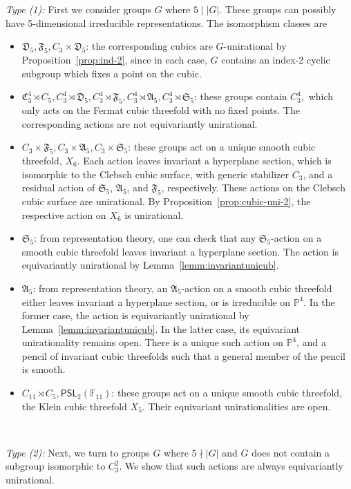 \documentclass[12pt,reqno]{amsart}
\theoremstyle{plain}
\theoremstyle{remark}
\theoremstyle{definition}
\numberwithin{equation}{section}
\def\fA{{\mathfrak A}}
\def\fC{{\mathfrak C}}
\def\fD{{\mathfrak D}}
\def\fF{{\mathfrak F}}
\def\fS{{\mathfrak S}}
\def\fS{{\mathfrak S}}
\def\bP{{\mathbb P}}
\def\bF{{\mathbb F}}
\def\PSL{\mathsf{PSL}}
\begin{document}
{\em{Type (1):}} First we consider groups $G$ where $5\mid|G|$. These groups can possibly have 5-dimensional irreducible representations. The isomorphism classes are 
\begin{itemize}
    \item $\fD_5,\fF_5,C_3\times\fD_5$: the corresponding cubics are $G$-unirational by Proposition~\ref{prop:ind-2}, since in each case, $G$ contains an index-2 cyclic subgroup which fixes a point on the cubic.
    \item $\fC_3^4\rtimes C_5, C_3^4\rtimes\fD_5, C_3^4\rtimes\fF_5, C_3^4\rtimes\fA_5, C_3^4\rtimes\fS_5$: these groups contain $C_3^4,$ which only acts on the Fermat cubic threefold with no fixed points. The corresponding actions are not equivariantly unirational. 
    \item $ C_3\times \fF_5, C_3\times \fA_5, C_3\times \fS_5 $: these groups act on a unique smooth cubic threefold, $X_6$. Each action leaves invariant a hyperplane section, which is isomorphic to the Clebsch cubic surface, with generic stabilizer $C_3$, and a residual action of $\fS_5$, $\fA_5$, and $\fF_5$, respectively. These actions on the Clebsch cubic surface are unirational. By Proposition~\ref{prop:cubic-uni-2}, the respective action on $X_6$ is unirational.
    \item $\fS_5$: from representation theory, one can check that any $\fS_5$-action on a smooth cubic threefold leaves invariant a hyperplane section. The action is equivariantly unirational by Lemma~\ref{lemm:invariantunicub}.
    \item  $\fA_5$: from representation theory, an $\fA_5$-action on a smooth cubic threefold either leaves invariant a hyperplane section, or is irreducible on $\bP^4$. In the former case, the action is equivariantly unirational by Lemma~\ref{lemm:invariantunicub}. In the latter case, its equivariant unirationality remains open. There is a unique such action on $\bP^4$, and a pencil of invariant cubic threefolds such that a general member of the pencil is smooth.  
    \item $C_{11}\rtimes C_5, \PSL_2(\bF_{11})$: these groups act on a unique smooth cubic threefold, the Klein cubic threefold $X_5$. Their equivariant unirationalities are open. 
\end{itemize}

\ 

{\em{Type (2):}}  Next, we turn to groups $G$ where $5\nmid |G|$ and $G$ does not contain a subgroup isomorphic to $C_3^2$. We show that such actions are always equivariantly unirational.
\end{document}
